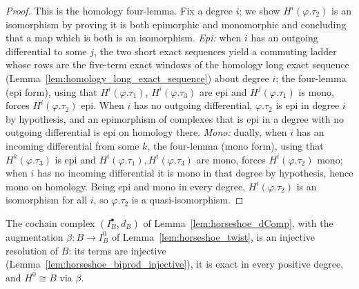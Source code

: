 \begin{proof}
  \leanok
  This is the homology four-lemma. Fix a degree \(i\); we show
  \(H^i(\varphi.\tau_2)\) is an isomorphism by proving it is both epimorphic and
  monomorphic and concluding that a map which is both is an isomorphism. \emph{Epi:}
  when \(i\) has an outgoing differential to some \(j\), the two short exact sequences
  yield a commuting ladder whose rows are the five-term exact windows of the homology
  long exact sequence (Lemma~\ref{lem:homology_long_exact_sequence}) about degree
  \(i\); the four-lemma (epi form), using that \(H^i(\varphi.\tau_1)\),
  \(H^i(\varphi.\tau_3)\) are epi and \(H^j(\varphi.\tau_1)\) is mono, forces
  \(H^i(\varphi.\tau_2)\) epi. When \(i\) has no outgoing differential,
  \(\varphi.\tau_2\) is epi in degree \(i\) by hypothesis, and an epimorphism of
  complexes that is epi in a degree with no outgoing differential is epi on homology
  there. \emph{Mono:} dually, when \(i\) has an incoming differential from some \(k\),
  the four-lemma (mono form), using that \(H^k(\varphi.\tau_3)\) is epi and
  \(H^i(\varphi.\tau_1), H^i(\varphi.\tau_3)\) are mono, forces
  \(H^i(\varphi.\tau_2)\) mono; when \(i\) has no incoming differential it is mono in
  that degree by hypothesis, hence mono on homology. Being epi and mono in every
  degree, \(H^i(\varphi.\tau_2)\) is an isomorphism for all \(i\), so
  \(\varphi.\tau_2\) is a quasi-isomorphism.
\end{proof}

\begin{lemma}
  \label{lem:horseshoe_resolvesMiddle}
  The cochain complex \((I_B^\bullet, d_B)\) of Lemma~\ref{lem:horseshoe_dComp}, with the
  augmentation \(\beta : B \to I_B^0\) of Lemma~\ref{lem:horseshoe_twist}, is an injective
  resolution of \(B\): its terms are injective
  (Lemma~\ref{lem:horseshoe_biprod_injective}), it is exact in every positive degree, and
  \(H^0 \cong B\) via \(\beta\).
\end{lemma}

